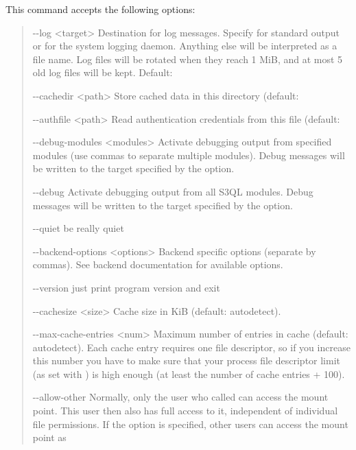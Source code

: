 \documentclass[letterpaper,10pt,english]{sphinxmanual}
\begin{document}
This command accepts the following options:
\begin{quote}
\begin{optionlist}{3cm}
\item [-{-}log \textless{}target\textgreater{}]  
Destination for log messages. Specify  for
standard output or  for the system logging
daemon. Anything else will be interpreted as a file
name. Log files will be rotated when they reach 1 MiB,
and at most 5 old log files will be kept. Default:
\item [-{-}cachedir \textless{}path\textgreater{}]  
Store cached data in this directory (default:
\item [-{-}authfile \textless{}path\textgreater{}]  
Read authentication credentials from this file
(default: 
\item [-{-}debug-modules \textless{}modules\textgreater{}]  
Activate debugging output from specified modules (use
commas to separate multiple modules). Debug messages
will be written to the target specified by the
 option.
\item [-{-}debug]  
Activate debugging output from all S3QL modules. Debug
messages will be written to the target specified by
the  option.
\item [-{-}quiet]  
be really quiet
\item [-{-}backend-options \textless{}options\textgreater{}]  
Backend specific options (separate by commas). See
backend documentation for available options.
\item [-{-}version]  
just print program version and exit
\item [-{-}cachesize \textless{}size\textgreater{}]  
Cache size in KiB (default: autodetect).
\item [-{-}max-cache-entries \textless{}num\textgreater{}]  
Maximum number of entries in cache (default:
autodetect). Each cache entry requires one file
descriptor, so if you increase this number you have to
make sure that your process file descriptor limit (as
set with ) is high enough (at least the
number of cache entries + 100).
\item [-{-}allow-other]  
Normally, only the user who called  can
access the mount point. This user then also has full
access to it, independent of individual file
permissions. If the  option is
specified, other users can access the mount point as

\end{optionlist}
\end{quote}
\end{document}
